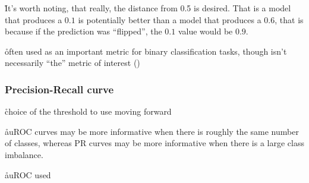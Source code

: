 \r{It's worth noting, that really, the distance from 0.5 is desired. That is a model that produces a $0.1$ is potentially better than a model that produces a $0.6$, that is because if the prediction was ``flipped'', the $0.1$ value would be $0.9$.}

\r{often used as an important metric for binary classification tasks, though isn't necessarily ``the'' metric of interest ()}


\subsubsection{Precision-Recall curve}


\r{choice of the threshold to use moving forward}

\r{auROC curves may be more informative when there is roughly the same number of classes, whereas PR curves may be more informative when there is a large class imbalance.\cite{davis2006relationship} }

\r{auROC \ALR used}